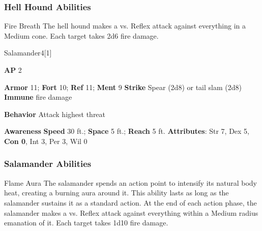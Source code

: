 \subsubsection{Hell Hound Abilities}

\begin{ability}{Fire Breath}
The hell hound makes a  vs. Reflex attack against everything in a Medium cone.
\hit Each target takes 2d6 fire damage.
\end{ability}






\begin{monsection}[Flamebrother]{Salamander}{4}[1]
\vspace{-1em}\vspace{-1em}
\begin{spellcontent}
\begin{spelltargetinginfo}
{\textbf{AP} 2}

\pari \textbf{Armor} 11;
\textbf{Fort} 10;
\textbf{Ref} 11;
\textbf{Ment} 9
\pari \textbf{Strike} Spear  (2d8) or tail slam  (2d8)
\pari \textbf{Immune} fire damage


\pari \textbf{Behavior} Attack highest threat
\end{spelltargetinginfo}
\end{spellcontent}

\begin{monsterfooter}
\pari \textbf{Awareness} 
\pari \textbf{Speed} 30 ft.;
\textbf{Space} 5 ft.;
\textbf{Reach} 5 ft.
\pari \textbf{Attributes}:
Str 7,
Dex 5,
\textbf{Con 0},
Int 3,
Per 3,
Wil 0
\end{monsterfooter}
\end{monsection}


\subsubsection{Salamander Abilities}

\begin{ability}{Flame Aura}
The salamander spends an action point to intensify its natural body heat, creating a burning aura around it.
This ability lasts as long as the salamander sustains it as a standard action.
At the end of each action phase, the salamander makes a  vs. Reflex
attack against everything within a Medium radius emanation of it.
\hit Each target takes 1d10 fire damage.
\end{ability}

